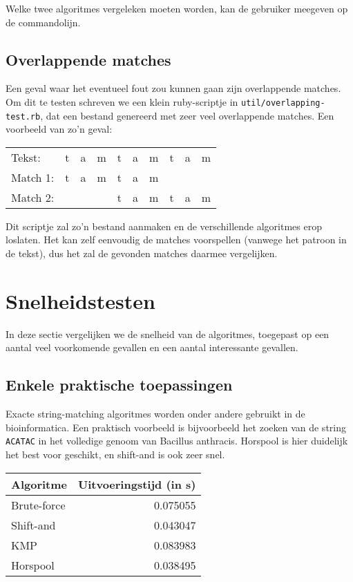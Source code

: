 \documentclass[a4paper,11pt]{article}
\begin{document}
Welke twee algoritmes vergeleken moeten worden, kan de gebruiker meegeven op de
commandolijn.

\subsection{Overlappende matches}

Een geval waar het eventueel fout zou kunnen gaan zijn overlappende matches. Om
dit te testen schreven we een klein ruby-scriptje in
\verb#util/overlapping-test.rb#, dat een bestand genereerd met zeer veel
overlappende matches. Een voorbeeld van zo'n geval:

\begin{center}
\begin{tabular}{llllllllll}
Tekst:   & t & a & m & t & a & m & t & a & m \\
Match 1: & t & a & m & t & a & m &   &   &   \\
Match 2: &   &   &   & t & a & m & t & a & m \\
\end{tabular}
\end{center}

Dit scriptje zal zo'n bestand aanmaken en de verschillende algoritmes erop
loslaten. Het kan zelf eenvoudig de matches voorspellen (vanwege het patroon in
de tekst), dus het zal de gevonden matches daarmee vergelijken.

\section{Snelheidstesten}

In deze sectie vergelijken we de snelheid van de algoritmes, toegepast op een
aantal veel voorkomende gevallen en een aantal interessante gevallen.

\subsection{Enkele praktische toepassingen}

Exacte string-matching algoritmes worden onder andere gebruikt in de
bioinformatica. Een praktisch voorbeeld is bijvoorbeeld het zoeken van de string
\verb#ACATAC# in het volledige genoom van Bacillus anthracis. Horspool is hier
duidelijk het best voor geschikt, en shift-and is ook zeer snel.

\begin{center}
\begin{tabular}{lr}
    Algoritme & Uitvoeringstijd (in s) \\
    \hline
    Brute-force & 0.075055 \\
    Shift-and & 0.043047 \\
    KMP & 0.083983 \\
    Horspool & 0.038495 \\
\end{tabular}
\end{center}
\end{document}

